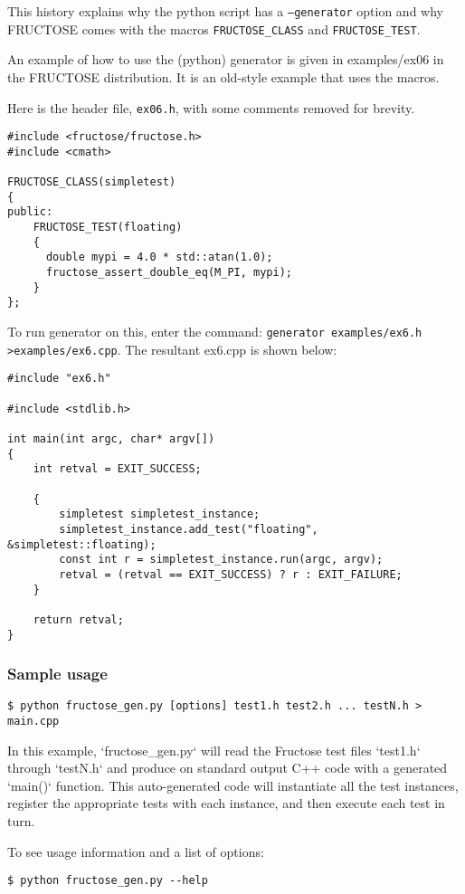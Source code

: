 \documentclass{book}
\begin{document}
This history explains why the python script has a {\tt --generator} option
and why FRUCTOSE comes with the macros {\tt FRUCTOSE\_CLASS}
and {\tt FRUCTOSE\_TEST}.

An example of how to use the (python) generator is given in 
examples/ex06 in the FRUCTOSE distribution. It is an old-style example
that uses the macros.

Here is the header file, {\tt ex06.h}, with some comments removed for brevity.

\begin{verbatim}
#include <fructose/fructose.h>
#include <cmath>

FRUCTOSE_CLASS(simpletest)
{
public:
    FRUCTOSE_TEST(floating)
    {
      double mypi = 4.0 * std::atan(1.0);
      fructose_assert_double_eq(M_PI, mypi);
    }
};
\end{verbatim}

To run generator on this, enter the command: 
{\tt generator examples/ex6.h >examples/ex6.cpp}.
The resultant ex6.cpp is shown below:

\begin{verbatim}
#include "ex6.h"

#include <stdlib.h>

int main(int argc, char* argv[])
{
    int retval = EXIT_SUCCESS;

    {
        simpletest simpletest_instance;
        simpletest_instance.add_test("floating", &simpletest::floating);
        const int r = simpletest_instance.run(argc, argv);
        retval = (retval == EXIT_SUCCESS) ? r : EXIT_FAILURE;
    }

    return retval;
}
\end{verbatim}

\subsubsection{Sample usage}

\begin{verbatim}
$ python fructose_gen.py [options] test1.h test2.h ... testN.h > main.cpp
\end{verbatim}
In this example, `fructose\_gen.py` will read the Fructose test files `test1.h`
through `testN.h` and produce on standard output C++ code with a generated
`main()` function. This auto-generated code will instantiate all the test
instances, register the appropriate tests with each instance, and then execute
each test in turn.

To see usage information and a list of options:
\begin{verbatim}
$ python fructose_gen.py --help
\end{verbatim}
\end{document}
